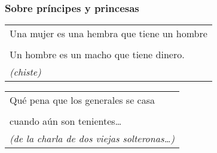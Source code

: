 \protect\hypertarget{M10}{}{}

\hypertarget{sobre-pruxedncipes-y-princesas}{\subsubsection{Sobre
príncipes y princesas}\label{sobre-pruxedncipes-y-princesas}}

\begin{longtable}[]{@{}l@{}}
\toprule
Una mujer es una hembra que tiene un hombre\tabularnewline
\tabularnewline
Un hombre es un macho que tiene dinero.\tabularnewline
\emph{(chiste)}\tabularnewline
\bottomrule
\end{longtable}

\begin{longtable}[]{@{}l@{}}
\toprule
Qué pena que los generales se casa\tabularnewline
\tabularnewline
cuando aún son tenientes\ldots{}\tabularnewline
\emph{(de la charla de dos viejas solteronas\ldots{})}\tabularnewline
\bottomrule
\end{longtable}

